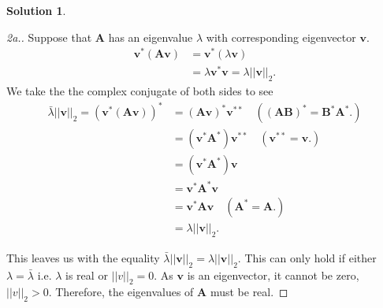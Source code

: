 \documentclass[12pt]{article}
\newcommand{\norm}[1]{ \left|\left| #1 \right|\right| }
\renewcommand{\vec}[1]{\mathbf{#1}}
\theoremstyle{definition}
\newtheorem{sol}{Solution}
\theoremstyle{remark}
\begin{document}
\begin{sol}
    \begin{proof}[2a.]
        Suppose that $\vec{A}$ has an eigenvalue $\lambda$ with corresponding eigenvector $\vec{v}$. 
        \begin{align}
            \vec{v}^*(\vec{Av}) &= \vec{v}^*(\lambda \vec{v})\\
                                &= \lambda \vec{v}^*\vec{v} = \lambda \norm{\vec{v}}_2.
        \end{align}
We take the the complex conjugate of both sides to see
\begin{align}
    \bar{\lambda} \norm{\vec{v}}_2 = (\vec{v}^*(\vec{Av}))^* &= (\vec{Av})^*\vec{v}^{**} \quad ((\vec{AB})^* = \vec{B}^*\vec{A}^*.) \\
                            &= (\vec{v}^* \vec{A}^*)\vec{v}^{**} \quad (\vec{v}^{**} = \vec{v}.)\\
                            &= (\vec{v}^* \vec{A}^*)\vec{v} \\ 
                            &= \vec{v}^*\vec{A}^*\vec{v} \\
                            &= \vec{v}^* \vec{A}\vec{v} \quad ( \vec{A}^* = \vec{A}. )\\
                            &= \lambda \norm{\vec{v}}_2.
\end{align}

This leaves us with the equality $\bar{\lambda}\norm{\vec{v}}_2 = \lambda \norm{\vec{v}}_2$. This can only hold if either $\lambda = \bar{\lambda}$ i.e. $\lambda$ is real or $\norm{v}_2 = 0$. As $\vec{v}$ is an eigenvector, it cannot be zero, $\norm{v}_2 > 0$. Therefore, the eigenvalues of $\vec{A}$ must be real.
    \end{proof}


\end{sol}
\end{document}
